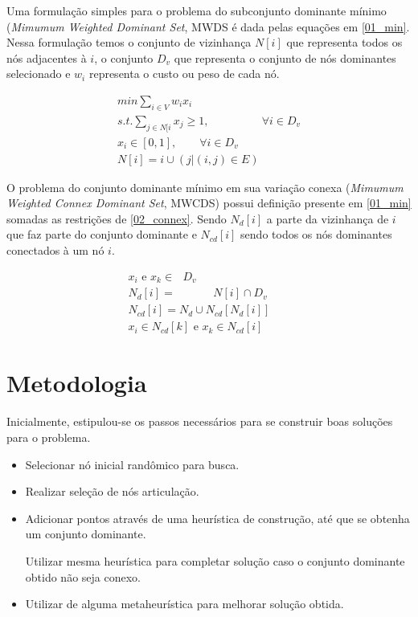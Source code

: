 \documentclass[conference,compsoc]{IEEEtran}
\begin{document}
Uma formulação simples para o problema do subconjunto dominante mínimo (\textit{Mimumum Weighted Dominant Set}, MWDS é dada pelas equações em \ref{01_min}. Nessa formulação temos o conjunto de vizinhança $N[i]$ que representa todos os nós adjacentes à $i$, o conjunto $D_v$ que representa o conjunto de nós dominantes selecionado e $w_i$ representa o custo ou peso de cada nó.

\begin{eqnarray*}
    min \sum_{i \in V} w_i x_i \\
    s.t. \sum_{j \in N[i} x_j  \geq 1 ,\text{ }\text{ }\text{ }\text{ }\text{ }\text{ }\text{ } \forall i \in D_v \\
         x_i \in [0,1],\text{ }\text{ }\text{ }\forall i \in D_v \\
         N[i] = {i} \cup (j |(i,j) \in E)
    \label{01_min}
\end{eqnarray*}

 O problema do conjunto dominante mínimo em sua variação conexa (\textit{Mimumum Weighted Connex Dominant Set}, MWCDS) possui definição presente em \ref{01_min} somadas as restrições de \ref{02_connex}. Sendo $N_d[i]$ a parte da vizinhança de $i$ que faz parte do conjunto dominante e $N_{cd}[i]$ sendo todos os nós dominantes conectados à um nó $i$.
 
\begin{eqnarray*}
    x_i \text{  e  } x_k \in \text{ } D_v\text{ }\text{ }\text{ }\text{ }\\
    N_d[i] = \text{ }\text{ }\text{ }\text{ }\text{ }N[i] \cap D_v\text{ }\text{ }\text{ }\\
    N_{cd}[i] = N_d \cup N_{cd}[N_d[i]]\\
    x_i \in N_{cd}[k] \text{  e  } x_k \in N_{cd}[i]
    \label{02_connex}
\end{eqnarray*}

\section{Metodologia}
Inicialmente, estipulou-se os passos necessários para se construir boas soluções para o problema.

\begin{itemize}
    \item Selecionar nó inicial randômico para busca.
    
    \item Realizar seleção de nós articulação.
    
    \item Adicionar pontos através de uma heurística de construção, até que se obtenha um conjunto dominante.
    
    \subitem Utilizar mesma heurística para completar solução caso o conjunto dominante obtido não seja conexo.
    
    \item Utilizar de alguma metaheurística para melhorar solução obtida.
\end{itemize}
\end{document}
